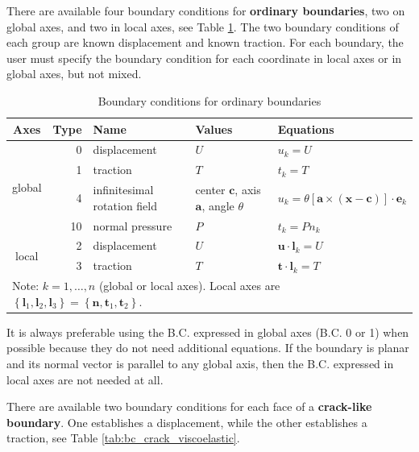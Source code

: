 \documentclass[a4paper,fleqn]{book}
\begin{document}
There are available four boundary conditions for \textbf{ordinary boundaries}, two on global axes, and two in local axes, see Table \ref{tab:bc_ordinary_viscoelastic}. The two boundary conditions of each group are known displacement and known traction. For each boundary, the user must specify the boundary condition for each coordinate in local axes or in global axes, but not mixed.

\begin{table}
\centering
{\footnotesize
\begin{tabular}{crlll}
\textbf{Axes} & \textbf{Type} & \textbf{Name} & \textbf{Values} & \textbf{Equations} \\
\midrule
\multirow{4}{*}{global} & 0 & displacement & $U$ & $u_k=U$ \\
\cline{2-5}
                        & 1 & traction     & $T$ & $t_k=T$ \\
\cline{2-5}
                        & 4 & infinitesimal rotation field & center $\mathbf{c}$, axis $\mathbf{a}$, angle $\theta$ & $u_k=\theta\left[\mathbf{a}\times\left(\mathbf{x}-\mathbf{c}\right)\right]\cdot\mathbf{e}_k$ \\
\cline{2-5}
                        & 10 & normal pressure & $P$ & $t_k=Pn_k$ \\
\hline
\multirow{2}{*}{local}  & 2 & displacement & $U$ & $\mathbf{u}\cdot\mathbf{l}_k=U$ \\
\cline{2-5}
                        & 3 & traction     & $T$ & $\mathbf{t}\cdot\mathbf{l}_k=T$ \\
\midrule
\multicolumn{5}{l}{Note: $k=1,\ldots,n$ (global or local axes). Local axes are $\left\{\mathbf{l}_1,\mathbf{l}_2,\mathbf{l}_3\right\}=\left\{\mathbf{n},\mathbf{t}_1,\mathbf{t}_2\right\}$.} \\
\end{tabular}
}
\caption{Boundary conditions for ordinary boundaries}
\label{tab:bc_ordinary_viscoelastic}
\end{table}

It is always preferable using the B.C. expressed in global axes (B.C. 0 or 1) when possible because they do not need additional equations. If the boundary is planar and its normal vector is parallel to any global axis, then the B.C. expressed in local axes are not needed at all.

There are available two boundary conditions for each face of a \textbf{crack-like boundary}. One establishes a displacement, while the other establishes a traction, see Table \ref{tab:bc_crack_viscoelastic}.
\end{document}
